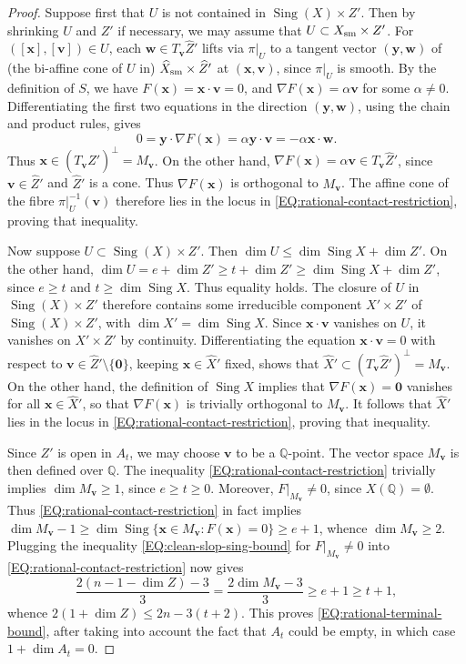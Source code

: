 \documentclass[a4paper,11pt, twoside,reqno]{amsart}
\theoremstyle{plain}
\theoremstyle{definition}
\theoremstyle{remark}
\newcommand{\bfv}{\bm{v}}
\newcommand{\bfx}{\bm{x}}
\newcommand{\bfy}{\bm{y}}
\newcommand{\QQ}{\mathbb{Q}}
\DeclareMathOperator{\sing}{Sing}
\renewcommand{\le}{\leqslant}
\renewcommand{\ge}{\geqslant}
\newcommand{\bfw}{\bm{w}}
\newcommand{\cone}{\widehat}
\numberwithin{equation}{section}
\begin{document}
\begin{proof}
Suppose first that $U$ is not contained in
$\sing(X) \times Z'$.
Then by shrinking $U$ and $Z'$ if necessary, we may assume that
$U \subset X_{\rm sm} \times Z'$.
For $([\bfx],[\bfv])\in U$, each $\bfw\in T_{\bfv} \cone Z'$
lifts via $\pi\vert_U$ to a tangent vector $(\bfy,\bfw)$
of (the bi-affine cone of $U$ in) $\cone X_{\rm sm} \times \cone Z'$
at $(\bfx,\bfv)$,
since $\pi\vert_U$ is smooth.
By the definition of $S$,
we have $F(\bfx) = \bfx\cdot\bfv = 0$,
and $\nabla F(\bfx)=\alpha\bfv$ for some $\alpha\ne 0$.
Differentiating the first two equations in the direction $(\bfy,\bfw)$,
using the chain and product rules, gives
\begin{equation*}
0 = \bfy \cdot \nabla F(\bfx)
= \alpha \bfy \cdot \bfv
= - \alpha \bfx \cdot \bfw.
\end{equation*}
Thus $\bfx\in (T_{\bfv} \cone Z')^\perp = M_{\bfv}$.
On the other hand, $\nabla F(\bfx) = \alpha\bfv \in T_{\bfv} \cone Z'$,
since $\bfv\in \cone Z'$ and $\cone Z'$ is a cone.
Thus $\nabla F(\bfx)$ is orthogonal to $M_{\bfv}$.
The affine cone of the fibre $\pi\vert_U^{-1}(\bfv)$
therefore lies in the locus in \eqref{EQ:rational-contact-restriction},
proving that inequality.

Now suppose $U\subset\sing(X)\times Z'$.
Then $\dim U \le \dim \sing X + \dim Z'$.
On the other hand, $\dim U = e + \dim Z'
\ge t + \dim Z'
\ge \dim \sing X + \dim Z'$,
since $e \ge t$
and $t \ge \dim \sing X$.
Thus equality holds.
The closure of $U$ in $\sing(X)\times Z'$
therefore contains some irreducible component $X' \times Z'$
of $\sing(X)\times Z'$, with $\dim X' = \dim \sing X$.
Since $\bfx \cdot \bfv$ vanishes on $U$,
it vanishes on $X' \times Z'$ by continuity.
Differentiating the equation $\bfx \cdot \bfv = 0$
with respect to $\bfv\in \cone Z' \setminus \{\bm0\}$, keeping $\bfx\in \cone X'$ fixed,
shows that $\cone X' \subset (T_{\bfv} \cone Z')^\perp = M_{\bfv}$.
On the other hand, the definition of $\sing X$
implies that $\nabla F(\bfx) = \bm0$ vanishes for all $\bfx\in \cone X'$,
so that $\nabla F(\bfx)$ is trivially orthogonal to $M_{\bfv}$.
It follows that $\cone X'$
lies in the locus in \eqref{EQ:rational-contact-restriction},
proving that inequality.

Since $Z'$ is open in $A_t$, we may choose $\bfv$ to be a $\QQ$-point.
The vector space $M_{\bfv}$ is then defined over $\QQ$.
The inequality \eqref{EQ:rational-contact-restriction}
trivially implies $\dim M_{\bfv} \ge 1$, since $e\ge t\ge 0$.
Moreover, $F\vert_{M_{\bfv}} \ne 0$, since $X(\QQ) = \emptyset$.
Thus \eqref{EQ:rational-contact-restriction} in fact implies
$\dim M_{\bfv} - 1
\ge \dim\sing\{\bfx\in M_{\bfv}:F(\bfx)=0\}
\ge e+1$, whence $\dim M_{\bfv} \ge 2$.
Plugging the inequality \eqref{EQ:clean-slop-sing-bound} for $F\vert_{M_{\bfv}} \ne 0$
into \eqref{EQ:rational-contact-restriction} now gives
\begin{equation*}
\frac{2(n-1-\dim Z) - 3}{3}
= \frac{2\dim M_{\bfv} - 3}{3}
\ge e+1 \ge t+1,
\end{equation*}
whence $2(1+\dim Z) \le 2n-3(t+2)$.
This proves \eqref{EQ:rational-terminal-bound},
after taking into account the fact that $A_t$ could be empty,
in which case $1+\dim A_t = 0$.
\end{proof}
\end{document}
